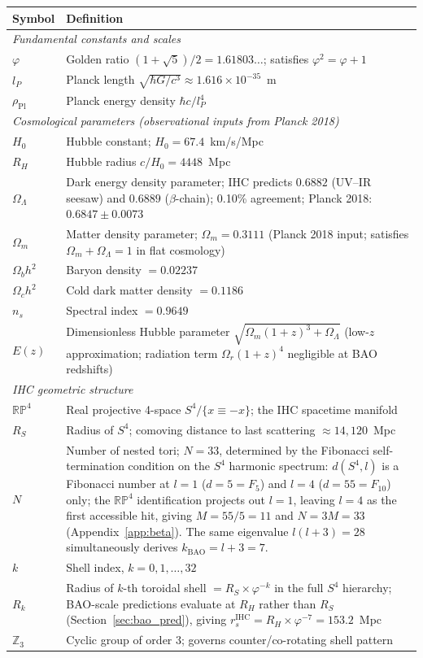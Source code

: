 \documentclass[12pt,a4paper]{article}
\begin{document}
\begin{longtable}{p{2.8cm} p{9.5cm}}
\toprule
\textbf{Symbol} & \textbf{Definition} \\
\midrule
\endhead
\multicolumn{2}{l}{\textit{Fundamental constants and scales}} \\[2pt]
$\varphi$ & Golden ratio $(1+\sqrt{5})/2 = 1.61803\ldots$; satisfies $\varphi^2 = \varphi+1$ \\
$l_P$ & Planck length $\sqrt{\hbar G/c^3} \approx 1.616 \times 10^{-35}$~m \\
$\rho_\mathrm{Pl}$ & Planck energy density $\hbar c / l_P^4$ \\[6pt]

\multicolumn{2}{l}{\textit{Cosmological parameters (observational inputs from Planck 2018)}} \\[2pt]
$H_0$ & Hubble constant; $H_0 = 67.4$~km/s/Mpc \\
$R_H$ & Hubble radius $c/H_0 = 4448$~Mpc \\
$\Omega_\Lambda$ & Dark energy density parameter; IHC predicts $0.6882$ (UV--IR seesaw) and $0.6889$ ($\beta$-chain); 0.10\% agreement; Planck 2018: $0.6847 \pm 0.0073$ \\
$\Omega_m$ & Matter density parameter; $\Omega_m = 0.3111$ (Planck 2018 input; satisfies $\Omega_m + \Omega_\Lambda = 1$ in flat cosmology) \\
$\Omega_b h^2$ & Baryon density $= 0.02237$ \\
$\Omega_c h^2$ & Cold dark matter density $= 0.1186$ \\
$n_s$ & Spectral index $= 0.9649$ \\
$E(z)$ & Dimensionless Hubble parameter $\sqrt{\Omega_m(1+z)^3 + \Omega_\Lambda}$ (low-$z$ approximation; radiation term $\Omega_r(1+z)^4$ negligible at BAO redshifts) \\[6pt]

\multicolumn{2}{l}{\textit{IHC geometric structure}} \\[2pt]
$\mathbb{RP}^4$ & Real projective 4-space $S^4/\{x \equiv -x\}$; the IHC spacetime manifold \\
$R_S$ & Radius of $S^4$; comoving distance to last scattering $\approx 14{,}120$~Mpc \\
$N$ & Number of nested tori; $N = 33$, determined by the Fibonacci self-termination condition on the $S^4$ harmonic spectrum: $d(S^4,l)$ is a Fibonacci number at $l=1$ ($d=5=F_5$) and $l=4$ ($d=55=F_{10}$) only; the $\mathbb{RP}^4$ identification projects out $l=1$, leaving $l=4$ as the first accessible hit, giving $M = 55/5 = 11$ and $N = 3M = 33$ (Appendix~\ref{app:beta}). The same eigenvalue $l(l+3) = 28$ simultaneously derives $k_\mathrm{BAO} = l+3 = 7$. \\
$k$ & Shell index, $k = 0, 1, \ldots, 32$ \\
$R_k$ & Radius of $k$-th toroidal shell $= R_S \times \varphi^{-k}$ in the full $S^4$ hierarchy; BAO-scale predictions evaluate at $R_H$ rather than $R_S$ (Section~\ref{sec:bao_pred}), giving $r_s^\mathrm{IHC} = R_H \times \varphi^{-7} = 153.2$~Mpc \\
$\mathbb{Z}_3$ & Cyclic group of order 3; governs counter/co-rotating shell pattern \\[6pt]


\end{longtable}
\end{document}
